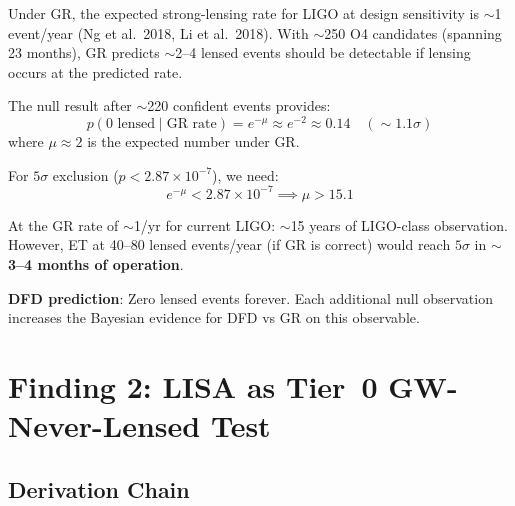 \documentclass[11pt]{article}
\begin{document}
\begin{tcolorbox}[colback=yellow!5!white, colframe=yellow!70!black,
  title=\textbf{How Many Events to Rule Out GW Lensing at 5$\sigma$?}]

Under GR, the expected strong-lensing rate for LIGO at design sensitivity
is $\sim$1 event/year (Ng et al.\ 2018, Li et al.\ 2018). With $\sim$250
O4 candidates (spanning 23 months), GR predicts $\sim$2--4 lensed events
should be detectable if lensing occurs at the predicted rate.

The null result after $\sim$220 confident events provides:
\begin{equation}
p(\text{0 lensed} \mid \text{GR rate}) = e^{-\mu} \approx e^{-2} \approx 0.14
\quad (\sim 1.1\sigma)
\end{equation}
where $\mu \approx 2$ is the expected number under GR.

For $5\sigma$ exclusion ($p < 2.87 \times 10^{-7}$), we need:
\begin{equation}
e^{-\mu} < 2.87 \times 10^{-7} \implies \mu > 15.1
\end{equation}

At the GR rate of $\sim$1/yr for current LIGO:
$\sim$15 years of LIGO-class observation. However, ET at 40--80
lensed events/year (if GR is correct) would reach $5\sigma$ in
\textbf{$\sim$3--4 months of operation}.

\textbf{DFD prediction}: Zero lensed events forever. Each additional
null observation increases the Bayesian evidence for DFD vs GR on this
observable.
\end{tcolorbox}

\section{Finding 2: LISA as Tier~0 GW-Never-Lensed Test}
\label{sec:lisa}

\subsection{Derivation Chain}
\end{document}
